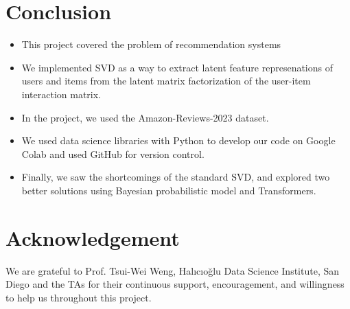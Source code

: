 \documentclass{article}
\begin{document}
\section{Conclusion}
\begin{itemize}
    \item This project covered the problem of recommendation systems
    \item We implemented SVD as a way to extract latent feature represenations of users and items from the latent matrix factorization of the user-item interaction matrix.
    \item In the project, we used the Amazon-Reviews-2023 dataset.
    \item We used data science libraries with Python to develop our code on Google Colab and used GitHub for version control.
    \item Finally, we saw the shortcomings of the standard SVD, and explored two better solutions using Bayesian probabilistic model and Transformers.
\end{itemize}

\section{Acknowledgement}
We are grateful to Prof. Tsui-Wei Weng, Halıcıoğlu Data Science Institute, San Diego and the TAs for their continuous support, encouragement, and willingness to help us throughout this project.



\end{document}
